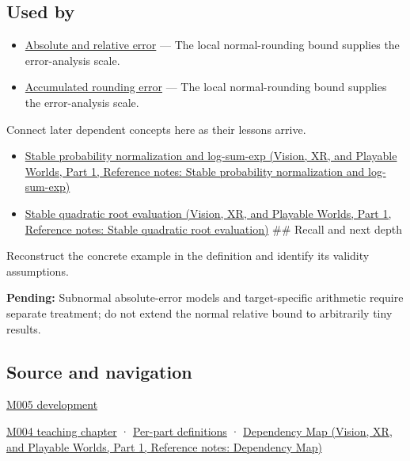 \subsection{Used by}\label{appendix-bc44f7b42f42-used-by}

\hypertarget{appendix-bc44f7b42f42-used-by}{}

\begin{itemize}
\tightlist
\item
  \hyperref[appendix-3ae74e89b4e6]{Absolute and relative error} --- The local normal-rounding bound supplies the error-analysis scale.
\item
  \hyperref[appendix-f82e270791c8]{Accumulated rounding error} --- The local normal-rounding bound supplies the error-analysis scale.
\end{itemize}

Connect later dependent concepts here as their lessons arrive.

\begin{itemize}
\tightlist
\item
  \href{../07-Vision-XR-and-Playable-Worlds-P01/main.pdf\#nameddest=appendix-d580b422240f}{Stable probability normalization and log-sum-exp (Vision, XR, and Playable Worlds, Part 1, Reference notes: Stable probability normalization and log-sum-exp)}
\item
  \href{../07-Vision-XR-and-Playable-Worlds-P01/main.pdf\#nameddest=appendix-b9afba7f63e5}{Stable quadratic root evaluation (Vision, XR, and Playable Worlds, Part 1, Reference notes: Stable quadratic root evaluation)} \#\# Recall and next depth
\end{itemize}

Reconstruct the concrete example in the definition and identify its validity assumptions.

\textbf{Pending:} Subnormal absolute-error models and target-specific arithmetic require separate treatment; do not extend the normal relative bound to arbitrarily tiny results.

\subsection{Source and navigation}\label{appendix-bc44f7b42f42-source-and-navigation}

\hypertarget{appendix-bc44f7b42f42-source-and-navigation}{}

\hyperref[01-foundations-i-ch001-when-arithmetic-meets-uncertainty]{M005 development}

\hyperref[01-foundations-i-ch001-a-stretching-ruler-for-real-valued-quantities]{M004 teaching chapter} · \hyperref[appendix-fd090d982a15-m004---parts-61-76]{Per-part definitions} · \href{../07-Vision-XR-and-Playable-Worlds-P01/main.pdf\#nameddest=appendix-4ad47bdd269a}{Dependency Map (Vision, XR, and Playable Worlds, Part 1, Reference notes: Dependency Map)}

